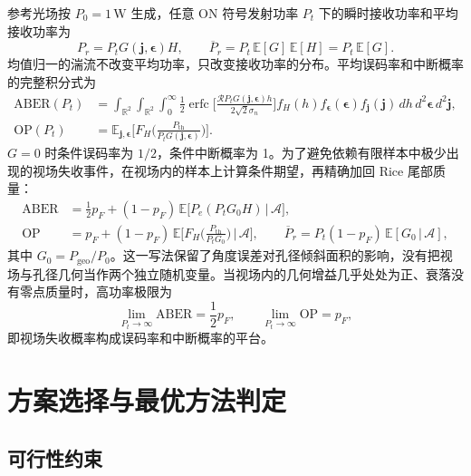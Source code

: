参考光场按 $P_0=1\,\mathrm W$ 生成，任意 ON 符号发射功率 $P_t$ 下的瞬时接收功率和平均接收功率为
\begin{equation}
P_r=P_tG(\mathbf j,\boldsymbol\epsilon)H,\qquad \overline P_r=P_t\,\mathbb E[G]\,\mathbb E[H]=P_t\,\mathbb E[G].
\label{eq:c5_pr}
\end{equation}
均值归一的湍流不改变平均功率，只改变接收功率的分布。平均误码率和中断概率的完整积分式为
\begin{align}
\mathrm{ABER}(P_t)&=\int_{\mathbb R^2}\!\int_{\mathbb R^2}\!\int_0^\infty\frac12\operatorname{erfc}\!\Big[\frac{\mathcal RP_tG(\mathbf j,\boldsymbol\epsilon)h}{2\sqrt2\sigma_n}\Big]f_H(h)f_{\boldsymbol\epsilon}(\boldsymbol\epsilon)f_{\mathbf j}(\mathbf j)\,dh\,d^2\boldsymbol\epsilon\,d^2\mathbf j,\label{eq:c5_aber}\\
\mathrm{OP}(P_t)&=\mathbb E_{\mathbf j,\boldsymbol\epsilon}\Big[F_H\Big(\frac{P_{\mathrm{th}}}{P_tG(\mathbf j,\boldsymbol\epsilon)}\Big)\Big].\label{eq:c5_op}
\end{align}
$G=0$ 时条件误码率为 $1/2$，条件中断概率为 1。为了避免依赖有限样本中极少出现的视场失收事件，在视场内的样本上计算条件期望，再精确加回 Rice 尾部质量：
\begin{align}
\mathrm{ABER}&=\frac12p_F+(1-p_F)\,\mathbb E\big[P_e(P_tG_0H)\,\big|\,\mathcal A\big],\label{eq:c5_aber_fov}\\
\mathrm{OP}&=p_F+(1-p_F)\,\mathbb E\Big[F_H\Big(\frac{P_{\mathrm{th}}}{P_tG_0}\Big)\,\Big|\,\mathcal A\Big],\qquad
\overline P_r=P_t(1-p_F)\,\mathbb E[G_0\,|\,\mathcal A],\label{eq:c5_op_fov}
\end{align}
其中 $G_0=P_{\mathrm{geo}}/P_0$。这一写法保留了角度误差对孔径倾斜面积的影响，没有把视场与孔径几何当作两个独立随机变量。当视场内的几何增益几乎处处为正、衰落没有零点质量时，高功率极限为
\begin{equation}
\lim_{P_t\to\infty}\mathrm{ABER}=\frac12p_F,\qquad \lim_{P_t\to\infty}\mathrm{OP}=p_F,
\label{eq:c5_floor}
\end{equation}
即视场失收概率构成误码率和中断概率的平台。

\section{方案选择与最优方法判定}
\label{sec:c5_opt}

\subsection{可行性约束}

